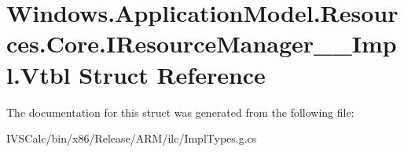 \hypertarget{struct_windows_1_1_application_model_1_1_resources_1_1_core_1_1_i_resource_manager_____impl_1_1_vtbl}{}\section{Windows.\+Application\+Model.\+Resources.\+Core.\+I\+Resource\+Manager\+\_\+\+\_\+\+Impl.\+Vtbl Struct Reference}
\label{struct_windows_1_1_application_model_1_1_resources_1_1_core_1_1_i_resource_manager_____impl_1_1_vtbl}


The documentation for this struct was generated from the following file\+:\begin{DoxyCompactItemize}
\item 
I\+V\+S\+Calc/bin/x86/\+Release/\+A\+R\+M/ilc/Impl\+Types.\+g.\+cs\end{DoxyCompactItemize}
